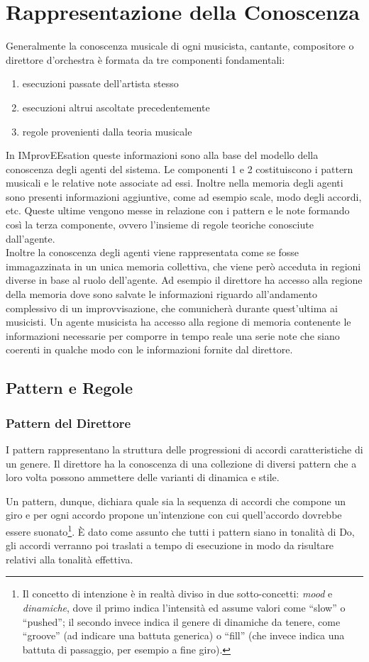 \section{Rappresentazione della Conoscenza}
Generalmente la conoscenza musicale di ogni musicista, cantante,
compositore o direttore d'orchestra è formata da tre 
componenti fondamentali:
\begin{enumerate}
\item esecuzioni passate dell'artista stesso
\item esecuzioni altrui ascoltate precedentemente
\item regole provenienti dalla teoria musicale
\end{enumerate}

In IMprovEEsation queste informazioni sono alla base del modello della
conoscenza degli agenti del sistema. Le componenti 1 e 2 costituiscono i
pattern musicali e le relative note associate ad essi. Inoltre nella memoria
degli agenti sono presenti informazioni aggiuntive, come ad esempio
scale, modo degli accordi, etc. Queste ultime vengono messe in relazione
con i pattern e le note formando così la terza componente, ovvero l'insieme 
di regole teoriche conosciute dall'agente.\\ 
Inoltre la conoscenza degli agenti viene rappresentata come se fosse 
immagazzinata in un unica memoria collettiva, che viene però acceduta in
regioni diverse in base al ruolo dell'agente. Ad esempio il direttore ha
accesso alla regione della memoria dove sono salvate le informazioni
riguardo all'andamento complessivo di un improvvisazione, che comunicherà
durante quest'ultima ai musicisti. Un agente musicista ha accesso alla
regione di memoria contenente le informazioni necessarie per comporre
in tempo reale una serie note che siano coerenti in qualche modo con le
informazioni fornite dal direttore.
\subsection{Pattern e Regole}
\subsubsection*{Pattern del Direttore}
\label{sec:pattern}
I pattern rappresentano la struttura delle progressioni di accordi caratteristiche di un genere.
Il direttore ha la conoscenza di una collezione di diversi pattern che
a loro volta possono ammettere delle varianti di dinamica e stile.

Un pattern, dunque, dichiara quale sia la sequenza di accordi che compone un giro e per ogni accordo propone un'intenzione con cui quell'accordo dovrebbe essere suonato\footnote{Il concetto di intenzione è in realtà diviso in due sotto-concetti: \emph{mood} e \emph{dinamiche}, dove il primo indica l'intensità ed assume valori come ``slow'' o ``pushed''; il secondo invece indica il genere di dinamiche da tenere, come ``groove'' (ad indicare una battuta generica) o ``fill'' (che invece indica una battuta di passaggio, per esempio a fine giro).}. \`E dato come assunto che tutti i pattern siano in tonalità di Do, gli accordi verranno poi traslati a tempo di esecuzione in modo da risultare relativi alla tonalità effettiva.


